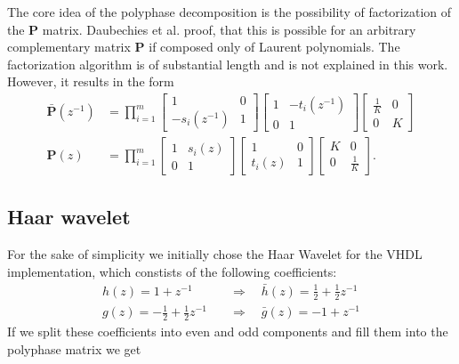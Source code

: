 \begin{refsection}
The core idea of the polyphase decomposition is the possibility of factorization of the $\bm P$ matrix.
Daubechies et al. proof, that this is possible for an arbitrary complementary matrix $\bm P$ if composed only of Laurent polynomials.
The factorization algorithm is of substantial length and is not explained in this work.
However, it results in the form
\begin{align}
	\bm{\bar P}(z^{-1}) &=
	\prod_{i=1}^{m}
	\begin{bmatrix}
		1 & 0 \\
		-s_i(z^{-1}) & 1
	\end{bmatrix}
	\begin{bmatrix}
		1 & -t_i(z^{-1}) \\
		0 & 1
	\end{bmatrix}
	\begin{bmatrix}
		\frac{1}{K} & 0 \\
		0 & K
	\end{bmatrix}
	\\
	\bm P(z) &=
	\prod_{i=1}^{m}
	\begin{bmatrix}
		1 & s_i(z) \\
		0 & 1
	\end{bmatrix}
	\begin{bmatrix}
		1 & 0 \\
		t_i(z) & 1
	\end{bmatrix}
	\begin{bmatrix}
		K & 0 \\
		0 & \frac{1}{K}
	\end{bmatrix}
	.
\end{align}

\subsection{Haar wavelet}
\label{fpga:sec:haar}

For the sake of simplicity we initially chose the Haar Wavelet for the VHDL implementation, which constists of the following coefficients:
\begin{align}
h(z) = 1 + z^{-1} \quad & \Rightarrow \quad \bar h(z) = \frac{1}{2} + \frac{1}{2} z^{-1}
\\
g(z) = - \frac{1}{2} + \frac{1}{2} z^{-1} \quad & \Rightarrow \quad \bar g(z) = -1 + z^{-1}
\end{align}
If we split these coefficients into even and odd components and fill them into the polyphase matrix we get 


\end{refsection}
